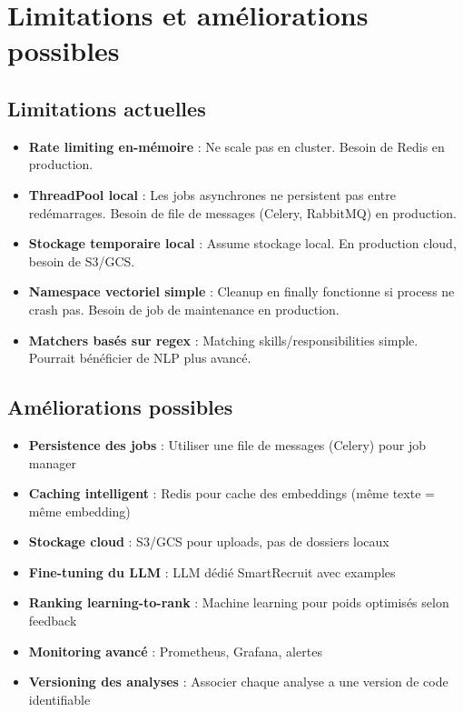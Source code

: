 \documentclass[12pt,a4paper,oneside]{book}
\begin{document}
\section{Limitations et améliorations possibles}

\subsection{Limitations actuelles}

\begin{itemize}
    \item \textbf{Rate limiting en-mémoire} : Ne scale pas en cluster. Besoin de Redis en production.
    
    \item \textbf{ThreadPool local} : Les jobs asynchrones ne persistent pas entre redémarrages. Besoin de file de messages (Celery, RabbitMQ) en production.
    
    \item \textbf{Stockage temporaire local} : Assume stockage local. En production cloud, besoin de S3/GCS.
    
    \item \textbf{Namespace vectoriel simple} : Cleanup en finally fonctionne si process ne crash pas. Besoin de job de maintenance en production.
    
    \item \textbf{Matchers basés sur regex} : Matching skills/responsibilities simple. Pourrait bénéficier de NLP plus avancé.
\end{itemize}

\subsection{Améliorations possibles}

\begin{itemize}
    \item \textbf{Persistence des jobs} : Utiliser une file de messages (Celery) pour job manager
    
    \item \textbf{Caching intelligent} : Redis pour cache des embeddings (même texte = même embedding)
    
    \item \textbf{Stockage cloud} : S3/GCS pour uploads, pas de dossiers locaux
    
    \item \textbf{Fine-tuning du LLM} : LLM dédié SmartRecruit avec examples
    
    \item \textbf{Ranking learning-to-rank} : Machine learning pour poids optimisés selon feedback
    
    \item \textbf{Monitoring avancé} : Prometheus, Grafana, alertes
    
    \item \textbf{Versioning des analyses} : Associer chaque analyse a une version de code identifiable
\end{itemize}
\end{document}
